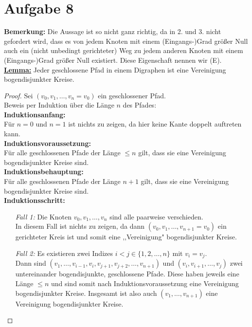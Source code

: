 \documentclass[a4paper,10pt,german]{scrartcl}
\begin{document}
\section*{Aufgabe 8}
{\bf Bemerkung:} Die Aussage ist so nicht ganz richtig, da in 2. und 3. nicht gefordert wird, dass es von jedem Knoten mit einem (Eingangs-)Grad größer Null auch ein (nicht unbedingt gerichteter) Weg zu jedem anderen Knoten mit einem (Eingangs-)Grad größer Null existiert. Diese Eigenschaft nennen wir (E).\\[5pt]
\underline{{\bf Lemma:}} Jeder geschlossene Pfad in einem Digraphen ist eine Vereinigung bogendisjunkter Kreise.
\begin{proof}
Sei $(v_0,v_1,\dots,v_n=v_0)$ ein geschlossener Pfad.\\
Beweis per Induktion über die Länge $n$ des Pfades:\\
{\bf Induktionsanfang:}\\
Für $n=0$ und $n=1$ ist nichts zu zeigen, da hier keine Kante doppelt auftreten kann.\\
{\bf Induktionsvoraussetzung:}\\
Für alle geschlossenen Pfade der Länge $\leq n$ gilt, dass sie eine Vereinigung bogendisjunkter Kreise sind.\\
{\bf Induktionsbehauptung:}\\
Für alle geschlossenen Pfade der Länge $n+1$ gilt, dass sie eine Vereinigung bogendisjunkter Kreise sind.\\
{\bf Induktionsschritt:}
\begin{itemize}
 \item[\emph{Fall 1:}] Die Knoten $v_0,v_1,\dots,v_n$ sind alle paarweise verschieden.\\
In diesem Fall ist nichts zu zeigen, da dann $(v_0,v_1,\dots,v_{n+1}=v_0)$ ein gerichteter Kreis ist und somit eine ,,Vereinigung" bogendisjunkter Kreise.
\item[\emph{Fall 2:}]Es existieren zwei Indizes $i<j\in\{1,2,\dots,n\}$ mit $v_i=v_j$.\\
Dann sind $(v_1,\dots,v_{i-1},v_i,v_{j+1},v_{j+2},\dots,v_{n+1})$ und $(v_i,v_{i+1},\dots,v_j)$ zwei untereinander bogendisjunkte, geschlossene Pfade. Diese haben jeweils eine Länge $\leq n$ und sind somit nach Induktionsvoraussetzung eine Vereinigung bogendisjunkter Kreise. Insgesamt ist also auch $(v_1,\dots,v_{n+1})$ eine Vereinigung bogendisjunkter Kreise.
\end{itemize}
\end{proof}
\end{document}
